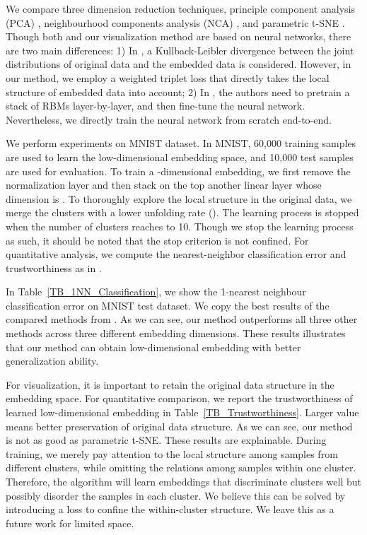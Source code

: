\documentclass[10pt,twocolumn,letterpaper]{article}
\begin{document}
We compare three dimension reduction techniques, principle component analysis (PCA) \cite{wold1987principal}, neighbourhood components analysis (NCA) \cite{roweis2004neighbourhood}, and parametric t-SNE \cite{maaten2009learning}. Though both \cite{maaten2009learning} and our visualization method are based on neural networks, there are two main differences: 1) In \cite{maaten2009learning}, a Kullback-Leibler divergence between the joint distributions of original data  and the embedded data is considered. However, in our method, we employ a weighted triplet loss that directly takes the local structure of embedded data into account; 2) In \cite{maaten2009learning}, the authors need to pretrain a stack of RBMs layer-by-layer, and then fine-tune the neural network. Nevertheless, we directly train the neural network from scratch end-to-end. 

We perform experiments on MNIST dataset. In MNIST, 60,000 training samples are used to learn the low-dimensional embedding space, and 10,000 test samples are used for evaluation. To train a -dimensional embedding, we first remove the normalization layer and then stack on the top another linear layer whose dimension is . To thoroughly explore the local structure in the original data, we merge the clusters with a lower unfolding rate (). The learning process is stopped when the number of clusters reaches to 10. Though we stop the learning process as such, it should be noted that the stop criterion is not confined. For quantitative analysis, we compute the nearest-neighbor classification error and trustworthiness as in \cite{maaten2009learning}.

In Table~\ref{TB_1NN_Classification}, we show the 1-nearest neighbour classification error on MNIST test dataset. We copy the best results of the compared methods from \cite{maaten2009learning}. As we can see, our method outperforms all three other methods across three different embedding dimensions. These results illustrates that our method can obtain low-dimensional embedding with better generalization ability.

For visualization, it is important to retain the original data structure in the embedding space. For quantitative comparison, we report the trustworthiness of learned low-dimensional embedding in Table~\ref{TB_Trustworthiness}. Larger value means better preservation of original data structure. As we can see, our method is not as good as parametric t-SNE. These results are explainable. During training, we merely pay attention to the local structure among samples from different clusters, while omitting the relations among samples within one cluster. Therefore, the algorithm will learn embeddings that discriminate clusters well but possibly disorder the samples in each cluster. We believe this can be solved by introducing a loss to confine the within-cluster structure. We leave this as a future work for limited space.
\end{document}
